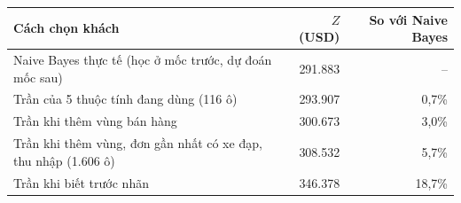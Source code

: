 \begin{tabular}{p{8.6cm}rr}
\toprule
Cách chọn khách & $Z$ (USD) & So với Naive Bayes \\
\midrule
Naive Bayes thực tế (học ở mốc trước, dự đoán mốc sau) & 291.883 & -- \\
Trần của 5 thuộc tính đang dùng (116 ô) & 293.907 & 0,7\% \\
Trần khi thêm vùng bán hàng & 300.673 & 3,0\% \\
Trần khi thêm vùng, đơn gần nhất có xe đạp, thu nhập (1.606 ô) & 308.532 & 5,7\% \\
Trần khi biết trước nhãn & 346.378 & 18,7\% \\
\bottomrule
\end{tabular}
